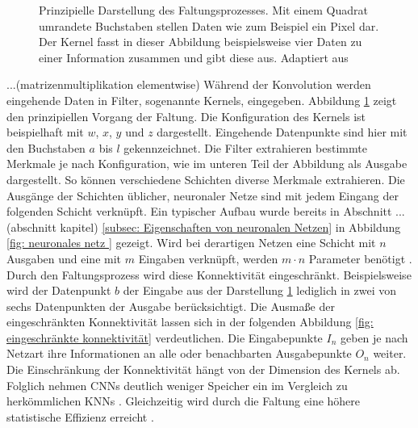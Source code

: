 \begin{figure}[H]
			\caption{Prinzipielle Darstellung des Faltungsprozesses. Mit einem Quadrat umrandete Buchstaben stellen Daten wie zum Beispiel ein Pixel dar. Der Kernel fasst in dieser Abbildung beispielsweise vier Daten zu einer Information zusammen und gibt diese aus. Adaptiert aus \cite{deeplearning}}
			\label{fig: faltung }
		\end{figure}
		
	
			...(matrizenmultiplikation elementwise)	
		Während der Konvolution werden eingehende Daten in Filter, sogenannte Kernels, eingegeben. Abbildung \ref{fig: faltung } zeigt den prinzipiellen Vorgang der Faltung. Die Konfiguration des Kernels ist beispielhaft mit $w$, $x$, $y$ und $z$ dargestellt. Eingehende Datenpunkte sind hier mit den Buchstaben $a$ bis $l$ gekennzeichnet. Die Filter extrahieren bestimmte Merkmale je nach Konfiguration, wie im unteren Teil der Abbildung als Ausgabe dargestellt. So können verschiedene Schichten diverse Merkmale extrahieren. Die Ausgänge der Schichten üblicher, neuronaler Netze sind mit jedem Eingang der folgenden Schicht verknüpft. Ein typischer Aufbau wurde bereits in Abschnitt ...(abschnitt kapitel) \ref{subsec: Eigenschaften von neuronalen Netzen} in Abbildung \ref{fig: neuronales netz } gezeigt. Wird bei derartigen Netzen eine Schicht mit $n$ Ausgaben und eine mit $m$ Eingaben verknüpft, werden $m \cdot n$ Parameter benötigt \cite{deeplearning}. Durch den Faltungsprozess wird diese Konnektivität eingeschränkt. Beispielsweise wird der Datenpunkt $b$ der Eingabe aus der Darstellung \ref{fig: faltung } lediglich in zwei von sechs Datenpunkten der Ausgabe berücksichtigt. Die Ausmaße der eingeschränkten Konnektivität lassen sich in der folgenden Abbildung \ref{fig: eingeschränkte konnektivität} verdeutlichen. Die Eingabepunkte $I_n$ geben je nach Netzart ihre Informationen an alle oder benachbarten Ausgabepunkte $O_n$ weiter. Die Einschränkung der Konnektivität hängt von der Dimension des Kernels ab. Folglich nehmen CNNs deutlich weniger Speicher ein im Vergleich zu herkömmlichen KNNs \cite{deeplearning}. Gleichzeitig wird durch die Faltung eine höhere statistische Effizienz erreicht \cite{deeplearning}.\\
		
